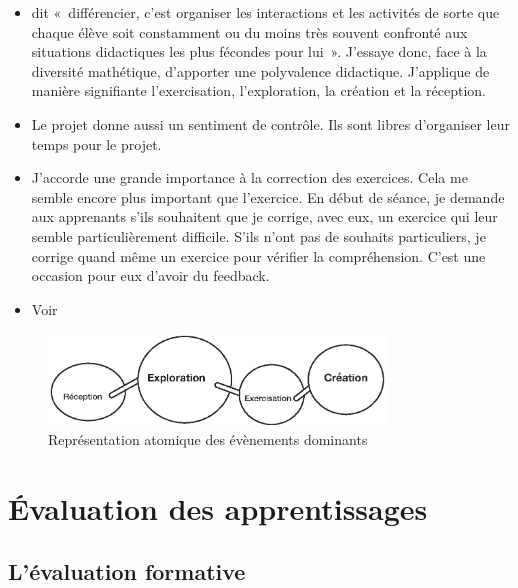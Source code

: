 \begin{itemize}
    \item \citet{perrenoud1992differenciation} dit «~différencier, c’est organiser les interactions et les activités de sorte que chaque élève soit constamment ou du moins très souvent confronté aux situations didactiques les plus fécondes pour lui~». J’essaye donc, face à la diversité mathétique, d’apporter une polyvalence didactique. J'applique de manière signifiante l'exercisation, l'exploration, la création et la réception.
    \item Le projet donne aussi un sentiment de contrôle. Ils sont libres d'organiser leur temps pour le projet.
    \item J'accorde une grande importance à la correction des exercices. Cela me semble encore plus important que l'exercice. En début de séance, je demande aux apprenants s'ils souhaitent que je corrige, avec eux, un exercice qui leur semble particulièrement difficile. S’ils n’ont pas de souhaits particuliers, je corrige quand même un exercice pour vérifier la compréhension. C'est une occasion pour eux d’avoir du feedback.
    \item Voir \cite{famose2016apprendre}
\end{itemize}
\begin{figure}[H]
    \begin{center}
        \includegraphics[width=0.8\textwidth]{figures/EAEs.eps}
        \caption{Représentation atomique des évènements dominants \cite{leclercq2008modele}}
    \end{center}
\end{figure}
\clearpage

\section{Évaluation des apprentissages}

\subsection{L’évaluation formative}
\label{eval_formative}

